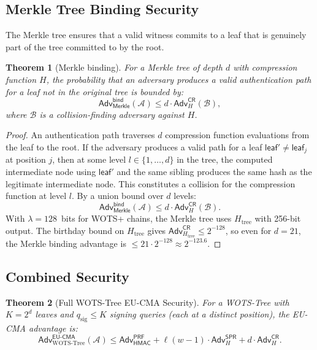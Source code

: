 \documentclass[11pt,a4paper]{article}
\newtheorem{theorem}{Theorem}[section]
\theoremstyle{definition}
\begin{document}
\subsection{Merkle Tree Binding Security}
\label{sec:merkle-security}

The Merkle tree ensures that a valid witness commits to a leaf that is genuinely part of the tree committed to by the root.

\begin{theorem}[Merkle binding]
\label{thm:merkle-binding}
For a Merkle tree of depth $d$ with compression function $H$, the probability that an adversary produces a valid authentication path for a leaf not in the original tree is bounded by:
$$
\mathsf{Adv}^{\mathsf{bind}}_{\mathsf{Merkle}}(\mathcal{A}) \leq d \cdot \mathsf{Adv}^{\mathsf{CR}}_H(\mathcal{B}),
$$
where $\mathcal{B}$ is a collision-finding adversary against $H$.
\end{theorem}

\begin{proof}
An authentication path traverses $d$ compression function evaluations from the leaf to the root. If the adversary produces a valid path for a leaf $\mathsf{leaf}' \neq \mathsf{leaf}_j$ at position $j$, then at some level $l \in \{1, \ldots, d\}$ in the tree, the computed intermediate node using $\mathsf{leaf}'$ and the same sibling produces the same hash as the legitimate intermediate node. This constitutes a collision for the compression function at level $l$. By a union bound over $d$ levels:
$$\mathsf{Adv}^{\mathsf{bind}}_{\mathsf{Merkle}}(\mathcal{A}) \leq d \cdot \mathsf{Adv}^{\mathsf{CR}}_H(\mathcal{B}).$$
With $\lambda = 128$~bits for WOTS+ chains, the Merkle tree uses $H_{\mathrm{tree}}$ with 256-bit output. The birthday bound on $H_{\mathrm{tree}}$ gives $\mathsf{Adv}^{\mathsf{CR}}_{H_{\mathrm{tree}}} \leq 2^{-128}$, so even for $d = 21$, the Merkle binding advantage is $\leq 21 \cdot 2^{-128} \approx 2^{-123.6}$.
\end{proof}

\subsection{Combined Security}

\begin{theorem}[Full WOTS-Tree EU-CMA Security]
\label{thm:full-security}
For a WOTS-Tree with $K = 2^d$ leaves and $q_{\mathrm{sig}} \leq K$ signing queries (each at a distinct position), the EU-CMA advantage is:
$$
\mathsf{Adv}^{\mathsf{EU\text{-}CMA}}_{\mathrm{WOTS\text{-}Tree}}(\mathcal{A})
\leq
\mathsf{Adv}^{\mathsf{PRF}}_{\mathsf{HMAC}}
+ \ell(w-1) \cdot \mathsf{Adv}^{\mathsf{SPR}}_H
+ d \cdot \mathsf{Adv}^{\mathsf{CR}}_H.
$$
\end{theorem}
\end{document}
